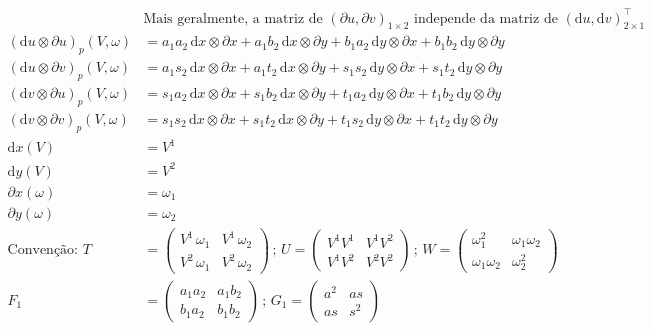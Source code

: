\documentclass[12pt]{article}
\begin{document}
\begin{align}
  &\text{Mais geralmente, a matriz de }(\partial u, \partial v)_{1 \times 2} \text{ independe da matriz de }(\mathrm{d} u, \mathrm{d} v)^\top_{2 \times 1}  \\
  (\mathrm{d} u \otimes \partial u)_p (V, \omega) &= a_1a_2\, \mathrm{d}x \otimes \partial x + a_1b_2\, \mathrm{d} x \otimes \partial y + b_1a_2\, \mathrm{d}y \otimes \partial x + b_1b_2 \, \mathrm{d}y \otimes \partial y\\
  (\mathrm{d} u \otimes \partial v)_p (V, \omega) &= a_1s_2\, \mathrm{d}x \otimes \partial x + a_1t_2\, \mathrm{d} x \otimes \partial y + s_1s_2\, \mathrm{d}y \otimes \partial x + s_1t_2\, \mathrm{d}y \otimes \partial y \\
  (\mathrm{d} v \otimes \partial u)_p (V, \omega) &= s_1a_2\, \mathrm{d}x \otimes \partial x + s_1b_2\, \mathrm{d} x \otimes \partial y + t_1a_2\, \mathrm{d}y \otimes \partial x + t_1b_2\, \mathrm{d}y \otimes \partial y \\
  (\mathrm{d} v \otimes \partial v)_p (V, \omega) &= s_1s_2\, \mathrm{d}x \otimes \partial x + s_1t_2\, \mathrm{d} x \otimes \partial y + t_1s_2\, \mathrm{d}y \otimes \partial x + t_1t_2\, \mathrm{d}y \otimes \partial y \\
  \mathrm{d}x(V) &= V^1 \\
  \mathrm{d}y(V) &= V^2 \\
  \partial x (\omega) &= \omega_1 \\
  \partial y (\omega) &= \omega_2 \\
\text{Conven\c{c}\~ao: } T &= \left( \begin{matrix} V^1\, \omega_1 & V^1\, \omega_2 \\ V^2\, \omega_1 & V^2\, \omega_2 \end{matrix} \right) \,;\,U = \left( \begin{matrix} V^1V^1 & V^1 V^2 \\ V^1 V^2 & V^2V^2 \end{matrix} \right)\,;\,W = \left( \begin{matrix} \omega_1^2 & \omega_1 \omega_2 \\ \omega_1 \omega_2 & \omega_2^2 \end{matrix} \right) \\
F_1 &= \left( \begin{matrix} a_1 a_2 & a_1 b_2 \\ b_1 a_2 & b_1 b_2 \end{matrix} \right) \,;\,G_1 = \left( \begin{matrix} a^2 & as \\ as & s^2 \end{matrix} \right) \\

\end{align}
\end{document}
